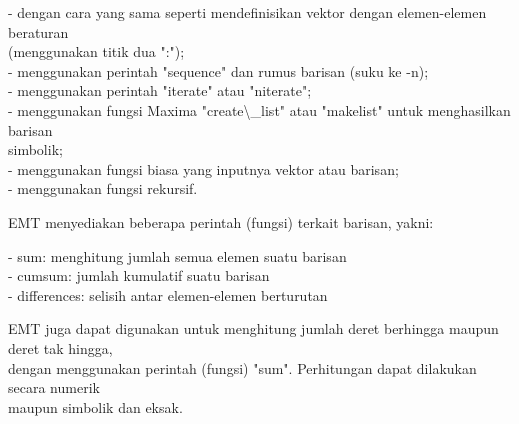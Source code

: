 \documentclass[12pt,Times new roman,letterpaper]{book}
\begin{document}
\begin{eulernootebook}
\begin{eulercomment}
\begin{eulercomment}
\begin{eulernootebook}
\begin{eulercomment}
\begin{eulercomment}
\begin{eulercomment}
\begin{eulercomment}
\begin{eulercomment}
\begin{eulercomment}
\begin{eulernotebook}
\begin{eulercomment}
\begin{eulercomment}
\begin{eulercomment}
\begin{eulercomment}
\begin{eulercomment}
\begin{eulercomment}
\begin{eulercomment}
\begin{eulercomment}
\begin{eulercomment}
\begin{eulercomment}
\begin{eulercomment}
\begin{eulercomment}
\begin{eulercomment}
\begin{eulercomment}
\begin{eulercomment}
\begin{eulercomment}
\begin{eulercomment}
\begin{eulercomment}
\begin{eulercomment}
\begin{eulercomment}
\begin{eulercomment}
\begin{eulercomment}
\begin{eulercomment}
\begin{eulercomment}
\begin{eulercomment}
- dengan cara yang sama seperti mendefinisikan vektor dengan
elemen-elemen beraturan\\
(menggunakan titik dua ":");\\
- menggunakan perintah "sequence" dan rumus barisan (suku ke -n);\\
- menggunakan perintah "iterate" atau "niterate";\\
- menggunakan fungsi Maxima "create\textbackslash{}\_list" atau "makelist" untuk
menghasilkan barisan\\
simbolik;\\
- menggunakan fungsi biasa yang inputnya vektor atau barisan;\\
- menggunakan fungsi rekursif.

EMT menyediakan beberapa perintah (fungsi) terkait barisan, yakni:

- sum: menghitung jumlah semua elemen suatu barisan\\
- cumsum: jumlah kumulatif suatu barisan\\
- differences: selisih antar elemen-elemen berturutan

EMT juga dapat digunakan untuk menghitung jumlah deret berhingga
maupun deret tak hingga,\\
dengan menggunakan perintah (fungsi) "sum". Perhitungan dapat
dilakukan secara numerik\\
maupun simbolik dan eksak.


\end{eulercomment}
\end{eulercomment}
\end{eulercomment}
\end{eulercomment}
\end{eulercomment}
\end{eulercomment}
\end{eulercomment}
\end{eulercomment}
\end{eulercomment}
\end{eulercomment}
\end{eulercomment}
\end{eulercomment}
\end{eulercomment}
\end{eulercomment}
\end{eulercomment}
\end{eulercomment}
\end{eulercomment}
\end{eulercomment}
\end{eulercomment}
\end{eulercomment}
\end{eulercomment}
\end{eulercomment}
\end{eulercomment}
\end{eulercomment}
\end{eulercomment}
\end{eulernotebook}
\end{eulercomment}
\end{eulercomment}
\end{eulercomment}
\end{eulercomment}
\end{eulercomment}
\end{eulercomment}
\end{eulernootebook}
\end{eulercomment}
\end{eulercomment}
\end{eulernootebook}
\end{document}
